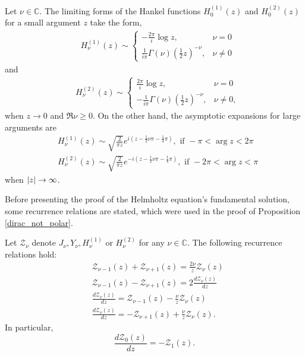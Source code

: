 \begin{proposition}\label{asympt_hankel_app_c}
    Let \(\nu \in \mathbb{C}\). The limiting forms of the Hankel functions \(H_0^{(1)}(z)\) and \(H_0^{(2)}(z)\) for a small argument \(z\) take the form,
    \begin{align*}
        &H_\nu^{(1)}(z) \sim
        \begin{cases}
            -\frac{2 \pi}{i} \log z, & \nu = 0\\
            \frac{1}{i \pi} \Gamma(\nu) \left(\frac{1}{2}z\right)^{-\nu}, & \nu \neq 0
        \end{cases}
    \end{align*}
    and
    \begin{align*}
        &H_\nu^{(2)}(z) \sim 
        \begin{cases}
            \frac{2 \pi}{i} \log z, & \nu = 0\\
            -\frac{1}{i \pi} \Gamma(\nu) \left(\frac{1}{2}z\right)^{-\nu}, & \nu \neq 0,
        \end{cases}
    \end{align*}
    when \(z \rightarrow 0\) and \(\Re{\nu} \geq 0\). On the other hand, the asymptotic expansions for large arguments are 
    \begin{align*}
        &H_\nu^{(1)}(z) \sim \sqrt{\frac{2}{\pi z}}e^{i\left(z-\frac{1}{2}\nu \pi - \frac{1}{4}\pi\right)}, \text{ if } -\pi < \arg z < 2 \pi\\
        &H_\nu^{(2)}(z) \sim \sqrt{\frac{2}{\pi z}}e^{-i\left(z-\frac{1}{2}\nu \pi - \frac{1}{4}\pi\right)}, \text{ if } -2\pi < \arg z < \pi
    \end{align*}
    when \(\abs{z} \rightarrow \infty\).
\end{proposition}

Before presenting the proof of the Helmholtz equation's fundamental solution, some recurrence relations are stated, which were used in the proof of Proposition \ref{dirac_not_polar}.

\begin{proposition}\label{recurrence_bessel_appendix_c}
    Let \(\mathcal{Z}_\nu\) denote \(J_\nu, Y_\nu, H^{(1)}_\nu\) or \(H^{(2)}_\nu\) for any \(\nu \in \mathbb{C}\). The following recurrence relations hold:
    \begin{align*}
        &\mathcal{Z}_{\nu-1}(z) + \mathcal{Z}_{\nu+1}(z) = \frac{2 \nu}{z}\mathcal{Z}_{\nu}(z)\\
        &\mathcal{Z}_{\nu-1}(z) - \mathcal{Z}_{\nu+1}(z) = 2\frac{d \mathcal{Z}_{\nu}(z)}{dz}\\
        &\frac{d \mathcal{Z}_{\nu}(z)}{dz} = \mathcal{Z}_{\nu-1}(z) - \frac{\nu}{z}\mathcal{Z}_{\nu}(z) \\
        &\frac{d \mathcal{Z}_{\nu}(z)}{dz} = -\mathcal{Z}_{\nu+1}(z) + \frac{\nu}{z}\mathcal{Z}_{\nu}(z).
    \end{align*}
    In particular,
    \[
        \frac{d \mathcal{Z}_{0}(z)}{dz} = -\mathcal{Z}_{1}(z).
    \]
\end{proposition}

